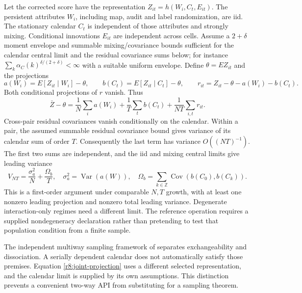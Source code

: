 Let the corrected score have the representation
$Z_{it}=h(W_i,C_t,E_{it})$. The persistent attributes $W_i$, including map,
audit and label randomization, are iid. The stationary calendar $C_t$ is
independent of those attributes and strongly mixing. Conditional innovations
$E_{it}$ are independent across cells. Assume a $2+\delta$ moment envelope and
summable mixing/covariance bounds sufficient for the calendar central limit
and the residual covariance sums below; for instance
$\sum_k\alpha_C(k)^{\delta/(2+\delta)}<\infty$ with a suitable uniform envelope.
Define $\theta=EZ_{it}$ and the projections
\[
 a(W_i)=E[Z_{it}\mid W_i]-\theta,\qquad
 b(C_t)=E[Z_{it}\mid C_t]-\theta,\qquad
 r_{it}=Z_{it}-\theta-a(W_i)-b(C_t).
\]
Both conditional projections of $r$ vanish. Thus
\begin{equation}
 \bar Z-\theta=\frac1N\sum_i a(W_i)+\frac1T\sum_t b(C_t)
                  +\frac1{NT}\sum_{i,t}r_{it}.
 \label{r8:joint-projection}
\end{equation}
Cross-pair residual covariances vanish conditionally on the calendar. Within a
pair, the assumed summable residual covariance bound gives variance of its
calendar sum of order $T$. Consequently the last term has variance
$O((NT)^{-1})$. The first two sums are independent, and the iid and mixing
central limits give leading variance
\begin{equation}
 V_{NT}=\frac{\sigma_a^2}{N}+\frac{\Omega_b}{T},\quad
 \sigma_a^2=\operatorname{Var}(a(W)),\quad
 \Omega_b=\sum_{k\in\mathbb Z}\operatorname{Cov}(b(C_0),b(C_k)).
 \label{r8:joint-variance}
\end{equation}
This is a first-order argument under comparable $N,T$ growth, with at least one
nonzero leading projection and nonzero total leading variance. Degenerate
interaction-only regimes need a different limit. The reference operation
requires a supplied nondegeneracy declaration rather than pretending to test
that population condition from a finite sample.

The independent multiway sampling framework of \citet{cluster2021} separates
exchangeability and dissociation. A serially dependent calendar does not
automatically satisfy those premises. Equation \eqref{r8:joint-projection}
uses a different selected representation, and the calendar limit is supplied
by its own assumptions. This distinction prevents a convenient two-way API
from substituting for a sampling theorem.

